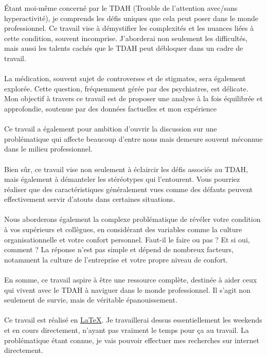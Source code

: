 Étant moi-même concerné par le TDAH (Trouble de l'attention avec/sans hyperactivité), je comprends les défis uniques que cela peut poser dans le monde professionnel. Ce travail vise à démystifier les complexités et les nuances liées à cette condition, souvent incomprise. J'aborderai non seulement les difficultés, mais aussi les talents cachés que le TDAH peut débloquer dans un cadre de travail.
\\
\\
La médication, souvent sujet de controverses et de stigmates, sera également explorée. Cette question, fréquemment gérée par des psychiatres, est délicate. Mon objectif à travers ce travail est de proposer une analyse à la fois équilibrée et approfondie, soutenue par des données factuelles et mon expérience 
\\
\\
Ce travail a également pour ambition d'ouvrir la discussion sur une problématique qui affecte beaucoup d'entre nous mais demeure souvent méconnue dans le milieu professionnel.
\\
\\
Bien sûr, ce travail vise non seulement à éclaircir les défis associés au TDAH, mais également à démanteler les stéréotypes qui l'entourent. Vous pourriez réaliser que des caractéristiques généralement vues comme des défauts peuvent effectivement servir d'atouts dans certaines situations.
\\
\\
Nous aborderons également la complexe problématique de révéler votre condition à vos supérieurs et collègues, en considérant des variables comme la culture organisationnelle et votre confort personnel. Faut-il le faire ou pas ? Et si oui, comment ? La réponse n'est pas simple et dépend de nombreux facteurs, notamment la culture de l'entreprise et votre propre niveau de confort.
\\
\\
En somme, ce travail aspire à être une ressource complète, destinée à aider ceux qui vivent avec le TDAH à naviguer dans le monde professionnel. Il s'agit non seulement de survie, mais de véritable épanouissement.
\\
\\
Ce travail est réalisé en \href{https://www.latex-project.org/}{LaTeX}. Je travaillerai dessus essentiellement les weekends et en cours directement, n'ayant pas vraiment le temps pour ça au travail. La problématique étant connue, je vais pouvoir effectuer mes recherches sur internet directement.